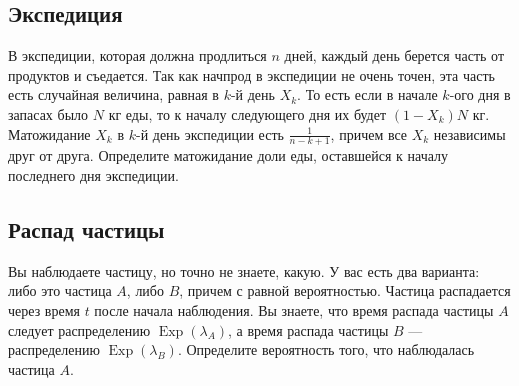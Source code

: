 \documentclass[12pt]{article}
\DeclareMathOperator{\Exp}{Exp}
\begin{document}
\subsection{Экспедиция}
В экспедиции, которая должна продлиться $n$ дней, каждый день берется часть от продуктов и съедается. Так как начпрод в экспедиции не очень точен, эта часть есть случайная величина, равная в $k$-й день $X_k$. То есть если в начале $k$-ого дня в запасах было $N$ кг еды, то к началу следующего дня их будет $(1 - X_k)N$ кг. Матожидание $X_k$ в $k$-й день экспедиции есть $\frac{1}{n - k + 1}$, причем все $X_k$ независимы друг от друга. Определите матожидание доли еды, оставшейся к началу последнего дня экспедиции.

\subsection{Распад частицы}
Вы наблюдаете частицу, но точно не знаете, какую. У вас есть два варианта: либо это частица $A$, либо $B$, причем с равной вероятностью. Частица распадается через время $t$ после начала наблюдения. Вы знаете, что время распада частицы $A$ следует распределению $\Exp(\lambda_A)$, а время распада частицы $B$ --- распределению $\Exp(\lambda_B)$. Определите вероятность того, что наблюдалась частица $A$.

\newpage
~
\newpage
\end{document}
